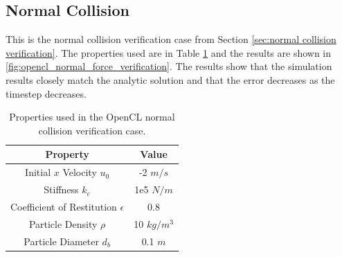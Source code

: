\documentclass[a4paper,11pt,titlepage]{report}
\begin{document}
\subsection{Normal Collision}
This is the normal collision verification case from Section \ref{sec:normal collision verification}. The properties used are in Table \ref{tab:opencl normal collision properties} and the results are shown in \ref{fig:opencl_normal_force_verification}. The results show that the simulation results closely match the analytic solution and that the error decreases as the timestep decreases.
\begin{table}[!htb]
\centering
\begin{tabular}{| c c |}
\hline
Property & Value\\
\hline
Initial $x$ Velocity $u_0$ & -2 $m/s$ \\
Stiffness $k_e$ & 1e5 $N/m$ \\
Coefficient of Restitution $\epsilon$ & 0.8 \\
Particle Density $\rho$ & 10 $kg/m^3$ \\
Particle Diameter $d_b$ & 0.1 $m$ \\
\hline
\end{tabular}
\caption{Properties used in the OpenCL normal collision verification case.}
\label{tab:opencl normal collision properties}
\end{table}
\end{document}
